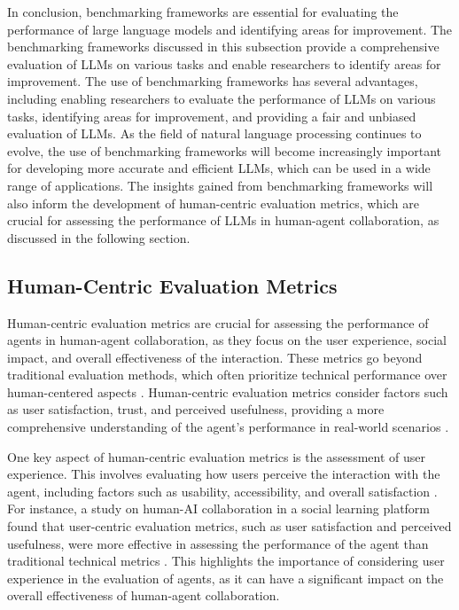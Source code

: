 \documentclass[11pt]{article}
\begin{document}
In conclusion, benchmarking frameworks are essential for evaluating the performance of large language models and identifying areas for improvement. The benchmarking frameworks discussed in this subsection provide a comprehensive evaluation of LLMs on various tasks and enable researchers to identify areas for improvement. The use of benchmarking frameworks has several advantages, including enabling researchers to evaluate the performance of LLMs on various tasks, identifying areas for improvement, and providing a fair and unbiased evaluation of LLMs. As the field of natural language processing continues to evolve, the use of benchmarking frameworks will become increasingly important for developing more accurate and efficient LLMs, which can be used in a wide range of applications. The insights gained from benchmarking frameworks will also inform the development of human-centric evaluation metrics, which are crucial for assessing the performance of LLMs in human-agent collaboration, as discussed in the following section.

\subsection{Human-Centric Evaluation Metrics}

Human-centric evaluation metrics are crucial for assessing the performance of agents in human-agent collaboration, as they focus on the user experience, social impact, and overall effectiveness of the interaction. These metrics go beyond traditional evaluation methods, which often prioritize technical performance over human-centered aspects \cite{ref203}. Human-centric evaluation metrics consider factors such as user satisfaction, trust, and perceived usefulness, providing a more comprehensive understanding of the agent's performance in real-world scenarios \cite{ref204}.

One key aspect of human-centric evaluation metrics is the assessment of user experience. This involves evaluating how users perceive the interaction with the agent, including factors such as usability, accessibility, and overall satisfaction \cite{ref205}. For instance, a study on human-AI collaboration in a social learning platform found that user-centric evaluation metrics, such as user satisfaction and perceived usefulness, were more effective in assessing the performance of the agent than traditional technical metrics \cite{ref206}. This highlights the importance of considering user experience in the evaluation of agents, as it can have a significant impact on the overall effectiveness of human-agent collaboration.
\end{document}
